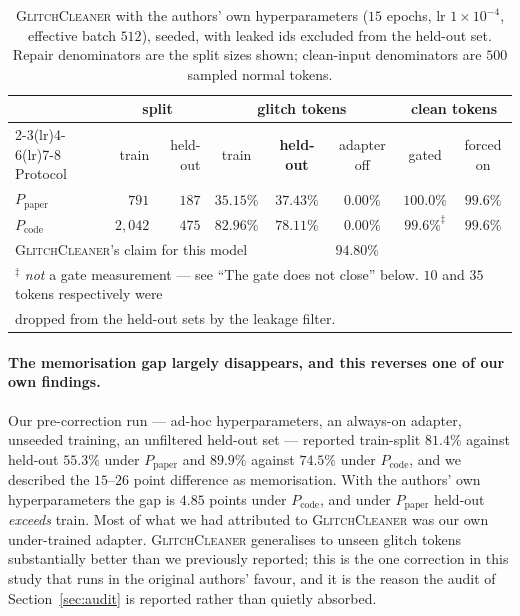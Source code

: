 \documentclass[11pt,a4paper]{article}
\newcommand{\gc}{\textsc{GlitchCleaner}}
\newcommand{\Ppaper}{$P_{\mathrm{paper}}$}
\newcommand{\Pcode}{$P_{\mathrm{code}}$}
\begin{document}
\begin{table}[h]
\centering
\caption{\gc{} with the authors' own hyperparameters ($15$ epochs, lr
$1\times10^{-4}$, effective batch $512$), seeded, with leaked ids excluded from
the held-out set. Repair denominators are the split sizes shown; clean-input
denominators are $500$ sampled normal tokens.}
\label{tab:gc}
\begin{tabular}{lrrccccc}
\toprule
& \multicolumn{2}{c}{split} & \multicolumn{3}{c}{glitch tokens} & \multicolumn{2}{c}{clean tokens} \\
\cmidrule(lr){2-3}\cmidrule(lr){4-6}\cmidrule(lr){7-8}
Protocol & train & held-out & train & \textbf{held-out} & adapter off & gated & forced on \\
\midrule
\Ppaper{} & $791$   & $187$ & $35.15\%$ & $\mathbf{37.43\%}$ & $0.00\%$ & $100.0\%$ & $99.6\%$ \\
\Pcode{}  & $2{,}042$ & $475$ & $82.96\%$ & $\mathbf{78.11\%}$ & $0.00\%$ & $99.6\%^{\ddagger}$ & $99.6\%$ \\
\midrule
\multicolumn{5}{l}{\gc{}'s claim for this model} & \multicolumn{3}{l}{$94.80\%$} \\
\bottomrule
\multicolumn{8}{l}{\footnotesize $^{\ddagger}$ \emph{not} a gate measurement --- see
``The gate does not close'' below. $10$ and $35$ tokens respectively were} \\
\multicolumn{8}{l}{\footnotesize dropped from the held-out sets by the leakage filter.}
\end{tabular}
\end{table}

\paragraph{The memorisation gap largely disappears, and this reverses one of our
own findings.} Our pre-correction run --- ad-hoc hyperparameters, an always-on
adapter, unseeded training, an unfiltered held-out set --- reported train-split
$81.4\%$ against held-out $55.3\%$ under \Ppaper{} and $89.9\%$ against $74.5\%$
under \Pcode{}, and we described the $15$--$26$ point difference as memorisation.
With the authors' own hyperparameters the gap is $4.85$ points under \Pcode{}, and
under \Ppaper{} held-out \emph{exceeds} train. Most of what we had attributed to
\gc{} was our own under-trained adapter. \gc{} generalises to unseen glitch tokens
substantially better than we previously reported; this is the one correction in
this study that runs in the original authors' favour, and it is the reason the
audit of Section~\ref{sec:audit} is reported rather than quietly absorbed.
\end{document}
